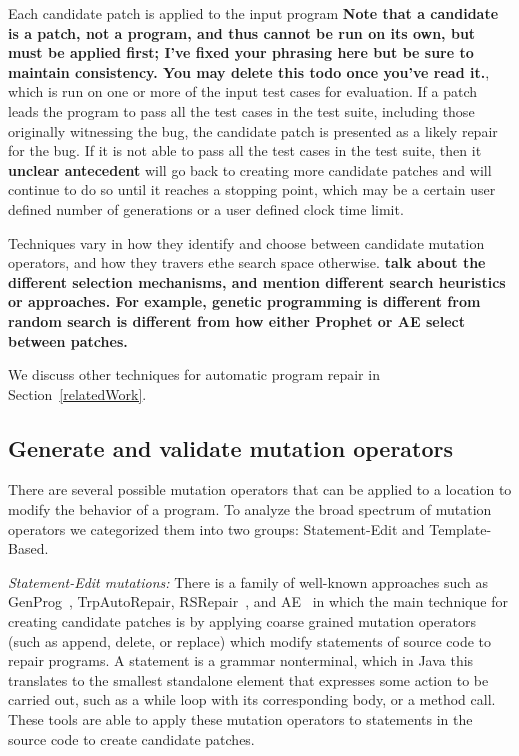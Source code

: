 \documentclass[conference]{IEEEtran}
\newcommand{\todo}[1]
  {{\scriptsize \textbf{\color{red} {#1}}}}
\begin{document}
Each candidate patch is applied to the input program \todo{Note that a candidate
  is a patch, not a program, and thus cannot be run on its own, but must be
  applied first; I've fixed your phrasing here but be sure to maintain
  consistency.  You may delete this todo once you've read it.}, which is run on
one or more of the input test cases for evaluation.  If a patch leads the
program to 
pass all the test cases in the test suite, including those originally witnessing
the bug, the candidate patch is presented as a likely repair for the bug. 
If it is not able to pass all the test cases in 
the test suite, then it\todo{unclear antecedent} will go back to creating more candidate patches and will 
continue to do so until it reaches a stopping point, which may be a certain user 
defined number of generations or a user defined clock time limit.

Techniques vary in how they identify and choose between candidate mutation
operators, and how they travers ethe search space otherwise. \todo{talk about
  the different selection mechanisms, and mention different search heuristics or
  approaches.  For example, genetic programming is different from random search
  is different from how either Prophet or AE select between patches.}

We discuss other techniques for automatic program repair in
Section~\ref{relatedWork}.

\subsection{Generate and validate mutation operators} 
\label{categorization}

There are several possible mutation operators that can be applied to a location 
to modify the behavior of a program. To analyze the broad 
spectrum of mutation operators we categorized them into two groups: 
Statement-Edit and Template-Based. 

\emph{Statement-Edit mutations:}
There is a family of well-known approaches such as GenProg~\cite{legoues12}, 
TrpAutoRepair\cite{Qi13}, RSRepair~\cite{Qi14}, and AE~\cite{Weimer13} in which the main technique for 
creating candidate 
patches is by applying coarse grained mutation operators (such as append, delete, or 
replace) which modify statements of source code to 
repair programs. A statement is  a grammar nonterminal, which in Java this translates to the smallest standalone element that expresses 
some action to be carried out, such as a while loop with its corresponding body, or a method call. These tools are able to 
apply these mutation operators to statements in the source code to 
create candidate patches.
\end{document}
